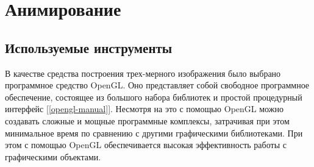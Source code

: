 \clearpage

\section{Анимирование}
\subsection{Используемые инструменты}
В качестве средства построения трех-мерного изображения было выбрано программное 
средство OpenGL. Оно представляет собой свободное программное обеспечение, состоящее 
из большого набора библиотек и простой процедурный интерфейс [\ref{opengl-manual}]. 
Несмотря на это с  помощью OpenGL можно создавать сложные и мощные программные 
комплексы, затрачивая при 
этом минимальное время по сравнению с другими графическими библиотеками. При этом с 
помощью OpenGL обеспечивается высокая эффективность работы с графическими объектами.
